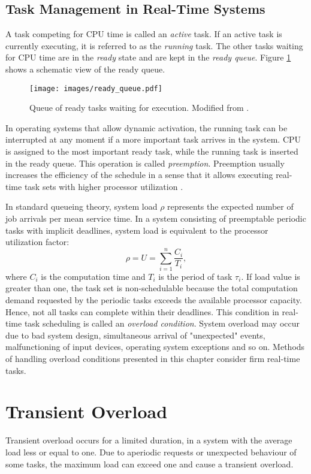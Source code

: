 \subsection{Task Management in Real-Time Systems}
A task competing for CPU time is called an \textit{active} task.
If an active task is currently executing, it is referred to as the \textit{running} task.
The other tasks waiting for CPU time are in the \textit{ready} state and are kept in the \textit{ready queue}.
Figure \ref{ready_queue} shows a schematic view of the ready queue.
\begin{figure}[ht]
    \centering
    \texttt{[image: images/ready\_queue.pdf]}
    \caption{Queue of ready tasks waiting for execution. Modified from \cite{buttazzo2011hard}.}
    \label{ready_queue}
\end{figure}
In operating systems that allow dynamic activation, the running task can be interrupted at any moment if a more important task arrives in the system.
CPU is assigned to the most important ready task, while the running task is inserted in the ready queue.
This operation is called \textit{preemption}.
Preemption usually increases the efficiency of the schedule in a sense that it allows executing real-time task sets with higher processor utilization \cite{buttazzo2011hard}.

In standard queueing theory, system load $\rho$ represents the expected number of job arrivals per mean service time. 
In a system consisting of preemptable periodic tasks with implicit deadlines, system load is equivalent to the processor utilization factor:
\begin{equation*}
\rho = U = \sum_{i=1}^{n}\frac{C_i}{T_i},
\end{equation*}
where $C_i$ is the computation time and $T_i$ is the period of task $\tau_i$.
If load value is greater than one, the task set is non-schedulable because the total computation demand requested by the periodic tasks exceeds the available processor capacity.
Hence, not all tasks can complete within their deadlines.
This condition in real-time task scheduling is called an \textit{overload condition}.
System overload may occur due to bad system design, simultaneous arrival of "unexpected" events, malfunctioning of input devices, operating system exceptions and so on.
Methods of handling overload conditions presented in this chapter consider firm real-time tasks.

\section{Transient Overload}
Transient overload occurs for a limited duration, in a system with the average load less or equal to one.
Due to aperiodic requests or unexpected behaviour of some tasks, the maximum load can exceed one and cause a transient overload.

